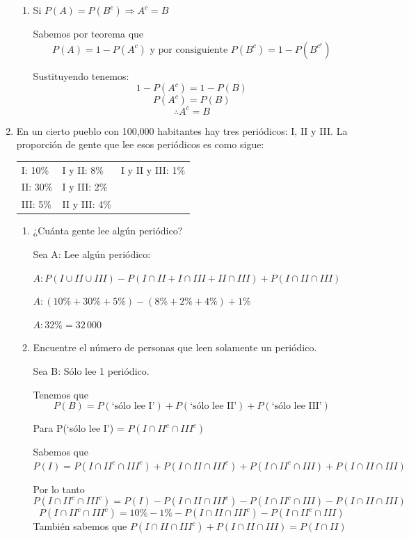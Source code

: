\documentclass[letterpaper,11pt]{article}
\renewcommand{%
	\contentsname}{\vspace{-1cm} \hfill\bfseries\LARGE Índice \hfill \vspace{0.2cm}%
}
\begin{document}
\begin{enumerate}
\begin{enumerate}
	\item Si $P(A) = P(B^c) \Rightarrow A^c = B$
	
	Sabemos por teorema que 
	$$
	P(A) = 1 - P (A^c) \text{ y por consiguiente } P(B^c) = 1 - P (B^{c^c})
	$$

	Sustituyendo tenemos: 
	$$
	1-P(A^c) = 1-P(B)
	$$
	$$
	P(A^c) = P(B)
	$$
	$$
	\therefore A^c = B
	$$

\end{enumerate}

\item En un cierto pueblo con 100,000 habitantes hay tres periódicos: I, II y III. La proporción de gente que lee esos periódicos es como sigue:

\begin{tabular}[h!]{l l l}
	I: 10\% & I y II: 8\% & I y II y III:  1\%\\
	II: 30\% &  I y III: 2\% & \\
	III: 5\% & II y III: 4\% & 
\end{tabular}

\begin{enumerate}
	\item ¿Cuánta gente lee algún periódico?
	
	Sea A: Lee algún periódico: 

	$A: P(I \cup II \cup III) - P(I\cap II + I \cap III + II \cap III) + P(I \cap II \cap III)$

	$A: (10\%+30\%+5\%) - (8\%+2\%+4\%) + 1\%$

	$A: 32\% = 32\, 000$

	\item Encuentre el número de personas que leen solamente un periódico.
	
	Sea B: Sólo lee 1 periódico. 

	Tenemos que
	\begin{equation}\label{0}
		P(B) = P(\text{`sólo lee I'}) + P(\text{`sólo lee II'}) + P(\text{`sólo lee III'})
	\end{equation}


	Para P(`sólo lee I') = $P (I \cap II^c \cap III^c  )$ 

	Sabemos que $P(I)= P(I \cap II^c \cap III^c) + P(I \cap II \cap III^c) + P(I \cap II^c \cap III) + P(I \cap II \cap III)$

	Por lo tanto
	\begin{equation} \label{1}
		P(I \cap II^c \cap III^c) = P(I) - P(I \cap II \cap III^c) - P(I \cap II^c \cap III) - P(I \cap II \cap III)		
	\end{equation}
	$$
	P(I \cap II^c \cap III^c) = 10\% - 1\% - P(I \cap II \cap III^c) - P(I \cap II^c \cap III)
	$$	
	También sabemos que $P(I \cap II \cap III^c) + P(I \cap II \cap III) = P(I \cap II)$
	

\end{enumerate}
\end{enumerate}
\end{document}
